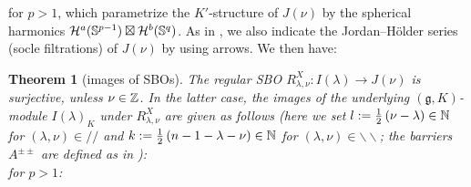 \documentclass[12pt]{article} %
\newtheorem{theorem}{Theorem}
\theoremstyle{definition}
\theoremstyle{exampstyle} \newtheorem{examp}[theorem]{Theorem}
\begin{document}
	for $p>1$, which parametrize the $K'$-structure of $J(\nu)$ by the spherical harmonics $\mathcal{H}^a(\mathbb{S}^{p-1})\boxtimes\mathcal{H}^b(\mathbb{S}^q)$.
	As in \cite{howe1993homogeneous}, we also indicate the Jordan--H\"older series (socle filtrations) of $J(\nu)$ by using arrows.
	We then have:
\begin{theorem}[images of SBOs]
	The regular SBO $R_{\lambda,\nu}^X:I(\lambda)\to J(\nu)$ is surjective,
	unless $\nu\in\mathbb{Z}$. In the latter case, the images of the underlying $(\mathfrak{g},K)$-module $I(\lambda)_K$ under
	$R_{\lambda,\nu}^X$ are given as follows (here we set $l:=\frac{1}{2}\left( \nu-\lambda \right)\in\mathbb{N}$ for $(\lambda,\nu)\in//$ and $k:=\frac{1}{2}\left( n-1-\lambda-\nu \right)
	\in\mathbb{N}$ for
	$(\lambda,\nu)\in\backslash\backslash$; the barriers $A^{\pm\pm}$ are defined as in \cite{howe1993homogeneous}): \\
	for $p>1$:
\end{theorem}
\end{document}
